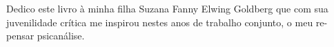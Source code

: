 \begingroup
\ifodd\thepage\relax\else\cleardoublepage\fi

\thispagestyle{empty}
\vspace*{.6\textheight}
\parindent0pt
\parskip6pt


\hfill\begin{minipage}{.7\textwidth}
\begin{flushleft}
Dedico este livro à minha filha Suzana Fanny Elwing Goldberg que com
sua juvenilidade crítica me inspirou nestes anos de trabalho conjunto, o
meu re-pensar psicanálise.
\end{flushleft}
\end{minipage}

\endgroup
